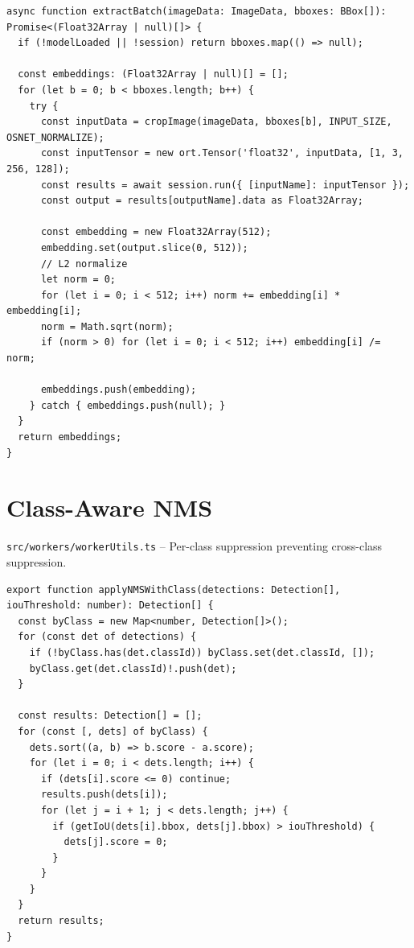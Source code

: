 \begin{lstlisting}[style=typescript, caption={ReID extractBatch()}, label={lst:reid-batch}]
async function extractBatch(imageData: ImageData, bboxes: BBox[]): Promise<(Float32Array | null)[]> {
  if (!modelLoaded || !session) return bboxes.map(() => null);

  const embeddings: (Float32Array | null)[] = [];
  for (let b = 0; b < bboxes.length; b++) {
    try {
      const inputData = cropImage(imageData, bboxes[b], INPUT_SIZE, OSNET_NORMALIZE);
      const inputTensor = new ort.Tensor('float32', inputData, [1, 3, 256, 128]);
      const results = await session.run({ [inputName]: inputTensor });
      const output = results[outputName].data as Float32Array;

      const embedding = new Float32Array(512);
      embedding.set(output.slice(0, 512));
      // L2 normalize
      let norm = 0;
      for (let i = 0; i < 512; i++) norm += embedding[i] * embedding[i];
      norm = Math.sqrt(norm);
      if (norm > 0) for (let i = 0; i < 512; i++) embedding[i] /= norm;

      embeddings.push(embedding);
    } catch { embeddings.push(null); }
  }
  return embeddings;
}
\end{lstlisting}

\section{Class-Aware NMS}
\label{sec:code-nms}
\texttt{src/workers/workerUtils.ts} -- Per-class suppression preventing cross-class suppression.

\begin{lstlisting}[style=typescript, caption={applyNMSWithClass()}, label={lst:nms-class}]
export function applyNMSWithClass(detections: Detection[], iouThreshold: number): Detection[] {
  const byClass = new Map<number, Detection[]>();
  for (const det of detections) {
    if (!byClass.has(det.classId)) byClass.set(det.classId, []);
    byClass.get(det.classId)!.push(det);
  }

  const results: Detection[] = [];
  for (const [, dets] of byClass) {
    dets.sort((a, b) => b.score - a.score);
    for (let i = 0; i < dets.length; i++) {
      if (dets[i].score <= 0) continue;
      results.push(dets[i]);
      for (let j = i + 1; j < dets.length; j++) {
        if (getIoU(dets[i].bbox, dets[j].bbox) > iouThreshold) {
          dets[j].score = 0;
        }
      }
    }
  }
  return results;
}
\end{lstlisting}


